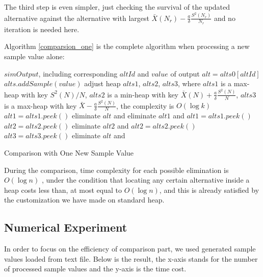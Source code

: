 The third step is even simpler, just checking the survival of the updated alternative against the alternative with largest $\bar{X}(N_r) - \frac{a}{\delta}\frac{S^2(N_r)}{N_r}$ and no iteration is needed here.

Algorithm \ref{comparsion_one} is the complete algorithm when processing a new sample value alone:

\begin{algorithm}
\begin{algorithmic}[1]
\Require $simOutput$, including corresponding $altId$ and $value$ of output
\State $alt = alts0[altId]$ 
  \State \Return
\EndIf
\State $alts.addSample(value)$ 
\State adjust heap $alts1$, $alts2$, $alts3$, where $alts1$ is a max-heap with key $S^2(N)/N$, $alts2$ is a min-heap with key $\bar{X}(N) + \frac{a}{\delta}\frac{S^2(N)}{N}$, $alts3$ is a max-heap with key $\bar{X} - \frac{a}{\delta}\frac{S^2(N)}{N}$, the complexity is $O(\log k)$
\State $alt1 = alts1.peek()$
    \State eliminate $alt$ and \Return {}
  \Else
    \State eliminate $alt1$ and $alt1 = alts1.peek()$ 
  \EndIf
\EndWhile
\State $alt2 = alts2.peek()$
  \State eliminate $alt2$ and $alt2 = alts2.peek()$ 
\EndWhile
\State $alt3 = alts3.peek()$
  \State eliminate $alt$ and \Return {}
\EndIf
\end{algorithmic}
\caption{Comparison with One New Sample Value}
\label{comparsion_one}
\end{algorithm}

During the comparison, time complexity for each possible elimination is $O(\log n)$ , under the condition that locating any certain alternative inside a heap costs less than, at most equal to $O(\log n)$, and this is already satisfied by the customization we have made on standard heap.

\subsection{Numerical Experiment}

In order to focus on the efficiency of comparison part, we used generated sample values loaded from text file. Below is the result, the x-axis stands for the number of processed sample values and the y-axis is the time cost.

